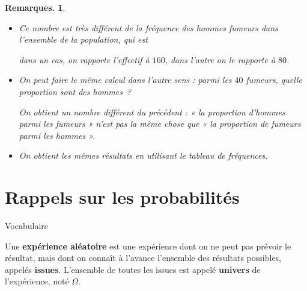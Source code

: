 \documentclass[12pt]{article}
\theoremstyle{break}
\newtheorem*{remarks}{Remarques.}
\begin{document}
\begin{remarks}
  \begin{itemize}
    \item Ce nombre est très différent de la fréquence des hommes fumeurs \emph{dans l'ensemble de la population}, qui est 

    \vspace{0.2em}

    \vspace{0.2em}
    dans un cas, on rapporte l'effectif à $160$, dans l'autre on le rapporte à $80$.
    
    \item On peut faire le même calcul dans l'autre sens : parmi les $40$ fumeurs, quelle proportion sont des hommes~?

    \vspace{0.2em}
    \framebox[1\linewidth]{\parbox{5.5in}{%
    \[
    \hideMW{\frac{24}{40} = 0{,}6 \quad \text{soit } 60\%.}
    \]
    \vspace{-1em}
    }}

    \vspace{0.2em}On obtient un nombre différent du précédent : « la proportion d'hommes parmi les fumeurs » n'est pas la même chose que « la proportion de fumeurs parmi les hommes ». %
    \item On obtient les mêmes résultats en utilisant le tableau de fréquences.
  \end{itemize}
 
\end{remarks}
 


\newpage

\section{Rappels sur les probabilités}



\begin{definition}{Vocabulaire}{}
  \begin{multihide}
  Une \textbf{expérience aléatoire} est une expérience dont on ne peut pas prévoir le résultat, mais dont on connaît à l'avance l'ensemble des résultats possibles, appelés \textbf{issues}. L'ensemble de toutes les issues est appelé \textbf{univers} de l'expérience, noté $\Omega$.
  \end{multihide}
\end{definition}
 
\end{document}
